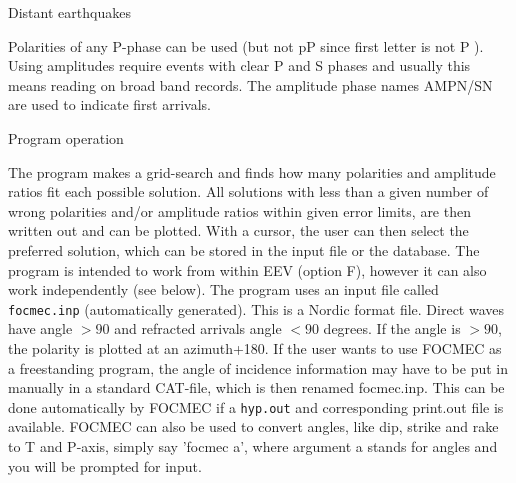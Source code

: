 Distant earthquakes

Polarities of any P-phase can be used (but not pP since first letter is not P ). Using amplitudes require events with clear P and S phases and usually this means reading on broad band records. The amplitude phase names AMPN/SN are used to indicate first arrivals.


Program operation

The program makes a grid-search and finds how many polarities and amplitude ratios fit each possible solution. All solutions with less than a given number of wrong polarities and/or amplitude ratios within given error limits, are then written out and can be plotted. With a cursor, the user can then select the preferred solution, which can be stored in the input file or the database.  The program is intended to work from within EEV (option F), however it can also work independently (see below). The program uses an input file called \texttt{focmec.inp} (automatically generated). This is a Nordic format file. Direct waves have angle $>90$ and refracted arrivals angle $<90$ degrees. If the angle is $>90$, the polarity is plotted at an azimuth+180. If the user wants to use FOCMEC as a freestanding program, the angle of incidence information may have to be put in manually in a standard CAT-file, which is then renamed focmec.inp. This can be done automatically by FOCMEC if a \texttt{hyp.out} and corresponding print.out file is available. 
FOCMEC can also be used to convert angles, like dip, strike and rake to T and P-axis, simply say 'focmec a', where argument a stands for angles and you will be prompted for input.


